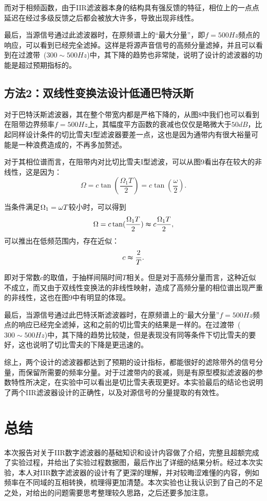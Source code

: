 \documentclass[a4paper,11pt,onecolumn,twoside]{article}
\begin{document}
而对于相频函数，由于IIR滤波器本身的结构具有强反馈的特征，相位上的一点点延迟在经过多级反馈之后都会被放大许多，导致出现非线性。

最后，当源信号通过此滤波器时，在原频谱上的``最大分量''，即$f=500Hz$频点的响应，可以看到已经完全滤掉。这样是将源声音信号的高频分量滤掉，并且可以看到在过渡带~($300\sim 500Hz$)中，其下降的趋势也非常陡，说明了设计的滤波器的功能是超过预期指标的。

\subsection{方法2：双线性变换法设计低通巴特沃斯}
对于巴特沃斯滤波器，其在整个带宽内都是严格下降的，从图8中我们也可以看到在阻带边界频率$f=500Hz$上，其幅度平方函数的衰减也仅仅是略微大于$50dB$，比起同样设计条件的切比雪夫I型滤波器要差一点，这也是因为通带内有很大裕量可能是一种浪费造成的，不再多加赘述。

对于其相位谱而言，在阻带内对比切比雪夫I型滤波，可以从图9看出存在较大的非线性，这是因为：
\begin{equation}
\Omega = c \tan (\frac{\Omega_1 T}{2}) = c \tan (\frac{\omega}{2}).
\end{equation}

当条件满足$\Omega_1 = \omega \/ T$较小时，可以得到
\begin{equation}
\Omega = c \tan (\frac{\Omega_1 T}{2}) \thickapprox c \frac{\Omega_1 T}{2},
\end{equation}
可以推出在低频范围内，存在近似：
\begin{equation}
c \thickapprox \frac{2}{T}.
\end{equation}

即对于常数$c$的取值，于抽样间隔时间$T$相关。但是对于高频分量而言，这种近似不成立，而又由于双线性变换法的非线性映射，造成了高频分量的相位谱出现严重的非线性，这也在图9中有明显的体现。

最后，当源信号通过此巴特沃斯滤波器时，在原频谱上的``最大分量''$f=500Hz$频点的响应已经完全滤掉，这和之前的切比雪夫的结果是一样的。在过渡带~($300\sim 500Hz$)中，其下降的趋势比较陡，但是表现没有同等条件下切比雪夫的要好，这也说明了切比雪夫的下降是更迅速的。

综上，两个设计的滤波器都达到了预期的设计指标，都能很好的滤除带外的信号分量，而保留所需要的频率分量。对于过渡带内的衰减，则是有原型模拟滤波器的参数特性所决定，在实验中可以看出是切比雪夫表现更好。本实验最后的结论也说明了两个IIR滤波器设计的正确性，以及对源信号的分量提取的有效性。

\section{总结}
本次报告对关于IIR数字滤波器的基础知识和设计内容做了介绍，完整且超额完成了实验过程，并给出了实验过程数据图，最后作出了详细的结果分析。经过本次实验，本人对IIR数字滤波器的设计有了更深的理解，并对较晦涩难懂的内容，例如频率在不同域的互相转换，梳理得更加清楚。本次实验也让我认识到了自己的不足之处，对给出的问题需要思考整理较久思路，之后还要多加注意。
\end{document}
